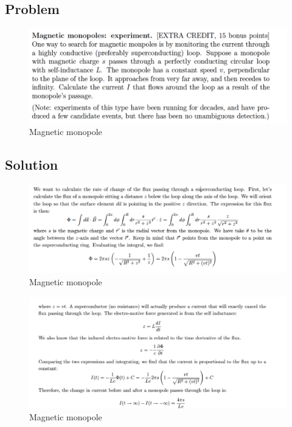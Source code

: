 \documentclass[solutions]{esg8022pset}
\begin{document}
\subsection{Problem}

 \begin{figure}[H]
    \centering
    \includegraphics[width = 15cm]{monopoles}
    \caption{Magnetic monopole}
  \end{figure}

\subsection{Solution}

 \begin{figure}[H]
    \centering
    \includegraphics[width = 15cm]{mono_sol_a}
    \caption{Magnetic monopole}
\end{figure}

 \begin{figure}[H]
    \centering
    \includegraphics[width = 15cm]{mono_sol_b}
    \caption{Magnetic monopole}
\end{figure}
\end{document}
